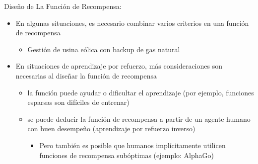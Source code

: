 \documentclass[handout]{beamer}
\begin{document}
\begin{frame}{Diseño de La Función de Recompensa: }
\begin{itemize}
\item  En algunas situaciones, es necesario combinar varios criterios en una función de recompensa
\begin{itemize}
\item<2-> Gestión de usina eólica con backup de gas natural
\end{itemize}
\item<4-> En situaciones de aprendizaje por refuerzo, más consideraciones son necesarias al diseñar la función de recompensa
\begin{itemize}
\item<5-> la función puede ayudar o dificultar el aprendizaje (por ejemplo, funciones esparsas son difíciles de entrenar)
\item<6-> se puede deducir la función de recompensa a partir de un agente humano con buen desempeño (aprendizaje por refuerzo inverso)
\begin{itemize}
\item<6-> Pero también es posible que humanos implícitamente utilicen funciones de recompensa subóptimas (ejemplo: AlphaGo)
\end{itemize}
\end{itemize}
\end{itemize}
\end{frame}
\end{document}
